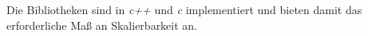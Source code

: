 Die Bibliotheken sind in \emph{c++} und \emph{c} implementiert und bieten damit das erforderliche Maß an Skalierbarkeit an.












